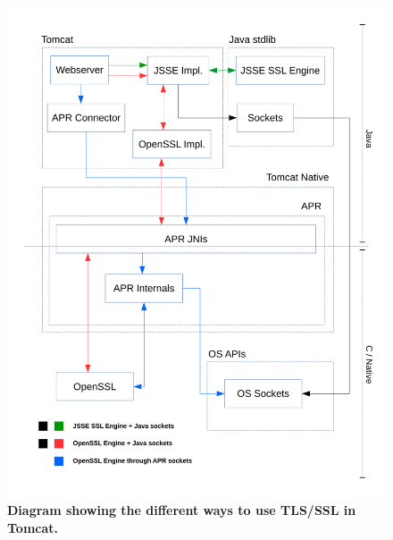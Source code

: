 \documentclass[11pt,a4paper,bibliography=totocnumbered]{scrartcl}
\begin{document}
\begin{figure}[!h]
\begin{center}
\includegraphics[scale=0.7]{diagram_current_way.pdf}
\end{center}
\caption{\textbf{Diagram showing the different ways to use TLS/SSL in Tomcat.}}
\label{fig:current}
\end{figure}
\end{document}
